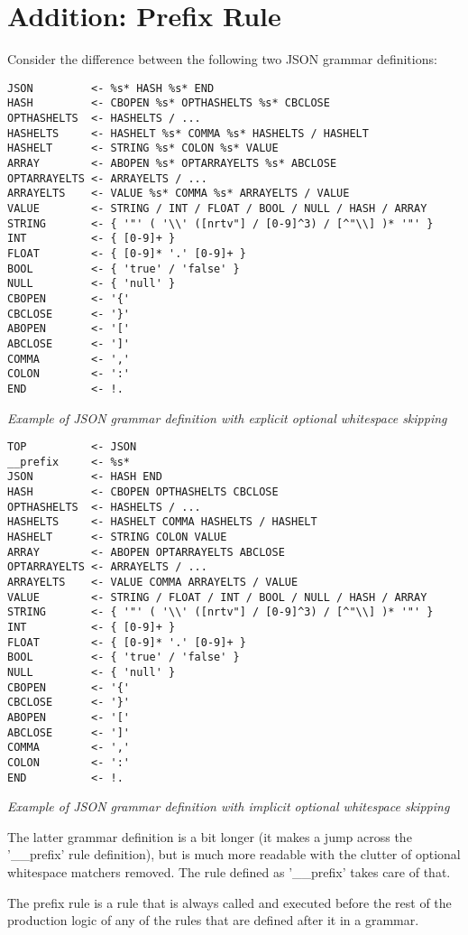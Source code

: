 \section{Addition: Prefix Rule}

Consider the difference between the following two JSON grammar
definitions:

\begin{myquote}
\begin{verbatim}
JSON         <- %s* HASH %s* END
HASH         <- CBOPEN %s* OPTHASHELTS %s* CBCLOSE
OPTHASHELTS  <- HASHELTS / ...
HASHELTS     <- HASHELT %s* COMMA %s* HASHELTS / HASHELT
HASHELT      <- STRING %s* COLON %s* VALUE
ARRAY        <- ABOPEN %s* OPTARRAYELTS %s* ABCLOSE
OPTARRAYELTS <- ARRAYELTS / ...
ARRAYELTS    <- VALUE %s* COMMA %s* ARRAYELTS / VALUE
VALUE        <- STRING / INT / FLOAT / BOOL / NULL / HASH / ARRAY
STRING       <- { '"' ( '\\' ([nrtv"] / [0-9]^3) / [^"\\] )* '"' }
INT          <- { [0-9]+ }
FLOAT        <- { [0-9]* '.' [0-9]+ }
BOOL         <- { 'true' / 'false' }
NULL         <- { 'null' }
CBOPEN       <- '{'
CBCLOSE      <- '}'
ABOPEN       <- '['
ABCLOSE      <- ']'
COMMA        <- ','
COLON        <- ':'
END          <- !.

\end{verbatim}
\end{myquote}
\textit{Example of JSON grammar definition with explicit optional whitespace skipping}

\begin{myquote}
\begin{verbatim}
TOP          <- JSON
__prefix     <- %s*
JSON         <- HASH END
HASH         <- CBOPEN OPTHASHELTS CBCLOSE
OPTHASHELTS  <- HASHELTS / ...
HASHELTS     <- HASHELT COMMA HASHELTS / HASHELT
HASHELT      <- STRING COLON VALUE
ARRAY        <- ABOPEN OPTARRAYELTS ABCLOSE
OPTARRAYELTS <- ARRAYELTS / ...
ARRAYELTS    <- VALUE COMMA ARRAYELTS / VALUE
VALUE        <- STRING / FLOAT / INT / BOOL / NULL / HASH / ARRAY
STRING       <- { '"' ( '\\' ([nrtv"] / [0-9]^3) / [^"\\] )* '"' }
INT          <- { [0-9]+ }
FLOAT        <- { [0-9]* '.' [0-9]+ }
BOOL         <- { 'true' / 'false' }
NULL         <- { 'null' }
CBOPEN       <- '{'
CBCLOSE      <- '}'
ABOPEN       <- '['
ABCLOSE      <- ']'
COMMA        <- ','
COLON        <- ':'
END          <- !.

\end{verbatim}
\end{myquote}
\textit{Example of JSON grammar definition with implicit optional whitespace skipping}

The latter grammar definition is a bit longer (it makes a jump across the '\_\_prefix'
rule definition), but is much more readable with the clutter of optional whitespace
matchers removed. The rule defined as '\_\_prefix' takes care of that.

The prefix rule is a rule that is always called and executed
before the rest of the production logic of any of the rules
that are defined after it in a grammar.
